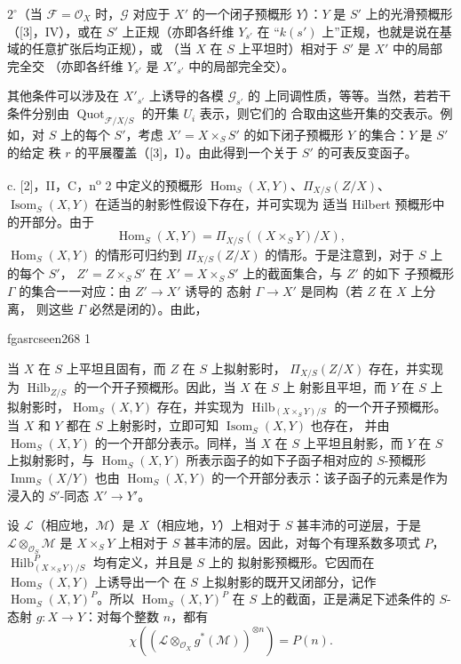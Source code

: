 \documentclass[12pt,twoside,openany]{book}
\numberwithin{equation}{section}
\newcommand{\fgaunitid}{unbound}
\newcommand{\src}[1]{%
  \phantomsection
  \hypertarget{src:\fgaunitid:#1}{}%
  \hypertarget{fga.\fgaunitid.p#1}{}%
  \ifcsname fgasrcseen#1\endcsname\else
    \expandafter\gdef\csname fgasrcseen#1\endcsname{1}%
    \hypertarget{src:#1}{}%
  \fi
  \marginpar{\raggedleft\footnotesize\sffamily #1}%
}
\theoremstyle{plain}
\theoremstyle{definition}
\theoremstyle{remark}
\begin{document}
\smallskip
\noindent $2^\circ$（当 $\mathcal F=\mathcal O_X$ 时，$\mathcal G$
对应于 $X'$ 的一个闭子预概形 $Y$）：$Y$ 是 $S'$ 上的光滑预概形
（[3]，IV），或在 $S'$ 上正规（亦即各纤维 $Y_{s'}$ 在
“$k(s')$ 上”正规，也就是说在基域的任意扩张后均正规），或
（当 $X$ 在 $S$ 上平坦时）相对于 $S'$ 是 $X'$ 中的局部完全交
（亦即各纤维 $Y_{s'}$ 是 $X'_{s'}$ 中的局部完全交）。

其他条件可以涉及在 $X'_{s'}$ 上诱导的各模 $\mathcal G_{s'}$ 的
上同调性质，等等。当然，若若干条件分别由
$\operatorname{Quot}_{\mathcal F/X/S}$ 的开集 $U_i$ 表示，则它们的
合取由这些开集的交表示。例如，对 $S$ 上的每个 $S'$，考虑
$X'=X\times_SS'$ 的如下闭子预概形 $Y$ 的集合：$Y$ 是 $S'$ 的给定
秩 $r$ 的平展覆盖（[3]，I）。由此得到一个关于 $S'$ 的可表反变函子。

\medskip
\noindent c. [2]，II，C，n\textsuperscript{o} 2 中定义的预概形
$\operatorname{Hom}_S(X,Y)$、$\Pi_{X/S}(Z/X)$、
$\operatorname{Isom}_S(X,Y)$ 在适当的射影性假设下存在，并可实现为
适当 Hilbert 预概形中的开部分。由于
\[
\operatorname{Hom}_S(X,Y)=\Pi_{X/S}((X\times_SY)/X),
\]
$\operatorname{Hom}_S(X,Y)$ 的情形可归约到
$\Pi_{X/S}(Z/X)$ 的情形。于是注意到，对于 $S$ 上的每个 $S'$，
$Z'=Z\times_SS'$ 在 $X'=X\times_SS'$ 上的截面集合，与 $Z'$ 的如下
子预概形 $\Gamma$ 的集合一一对应：由 $Z'\longrightarrow X'$ 诱导的
态射 $\Gamma\longrightarrow X'$ 是同构（若 $Z$ 在 $X$ 上分离，
则这些 $\Gamma$ 必然是闭的）。由此，

\src{268}
当 $X$ 在 $S$ 上平坦且固有，而 $Z$ 在 $S$ 上拟射影时，
$\Pi_{X/S}(Z/X)$ 存在，并实现为
$\operatorname{Hilb}_{Z/S}$ 的一个开子预概形。因此，当 $X$ 在 $S$ 上
射影且平坦，而 $Y$ 在 $S$ 上拟射影时，$\operatorname{Hom}_S(X,Y)$
存在，并实现为
$\operatorname{Hilb}_{(X\times_SY)/S}$ 的一个开子预概形。当 $X$ 和
$Y$ 都在 $S$ 上射影时，立即可知 $\operatorname{Isom}_S(X,Y)$ 也存在，
并由 $\operatorname{Hom}_S(X,Y)$ 的一个开部分表示。同样，当 $X$ 在
$S$ 上平坦且射影，而 $Y$ 在 $S$ 上拟射影时，与
$\operatorname{Hom}_S(X,Y)$ 所表示函子的如下子函子相对应的
$S$-预概形 $\operatorname{Imm}_S(X/Y)$ 也由
$\operatorname{Hom}_S(X,Y)$ 的一个开部分表示：该子函子的元素是作为
浸入的 $S'$-同态 $X'\longrightarrow Y'$。

设 $\mathcal L$（相应地，$\mathcal M$）是 $X$（相应地，$Y$）上相对于
$S$ 甚丰沛的可逆层，于是
$\mathcal L\otimes_{\mathcal O_S}\mathcal M$ 是 $X\times_SY$ 上相对于
$S$ 甚丰沛的层。因此，对每个有理系数多项式 $P$，
$\operatorname{Hilb}^P_{(X\times_SY)/S}$ 均有定义，并且是 $S$ 上的
拟射影预概形。它因而在 $\operatorname{Hom}_S(X,Y)$ 上诱导出一个
在 $S$ 上拟射影的既开又闭部分，记作
$\operatorname{Hom}_S(X,Y)^P$。所以
$\operatorname{Hom}_S(X,Y)^P$ 在 $S$ 上的截面，正是满足下述条件的
$S$-态射 $g:X\longrightarrow Y$：对每个整数 $n$，都有
\[
\chi\!\left(\left(\mathcal L\otimes_{\mathcal O_X}g^*(\mathcal M)\right)^{
\otimes n}\right)=P(n).
\]
\end{document}
